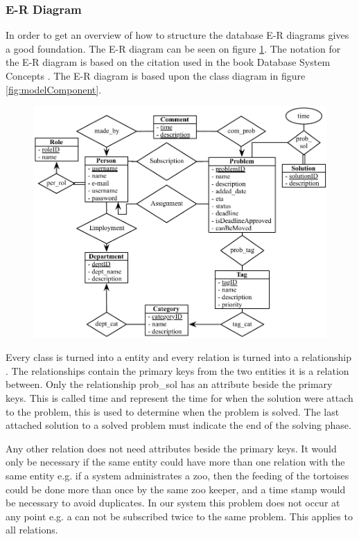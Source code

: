 \newcommand{\erdiagram}[1][]{E-R diagram}
\subsubsection{E-R Diagram}
In order to get an overview of how to structure the database \erdiagram[]s gives a good foundation.
The \erdiagram[] can be seen on figure \ref{fig:er_diagram}.
The notation for the \erdiagram[] is based on the citation used in the book Database System Concepts \cite[p. 305]{Sudershan2011}. 
The \erdiagram[] is based upon the class diagram in figure \ref{fig:modelComponent}. 

\begin{figure}[h]
	\centering
		\includegraphics[scale=0.8]{input/component_design/ER-diagram.pdf}
	\label{fig:er_diagram}
\end{figure}

Every class is turned into a entity and every relation is turned into a relationship \cite[p. 259 - 321]{Sudershan2011}.
The relationships contain the primary keys from the two entities it is a relation between.
Only the relationship prob\_sol has an attribute beside the primary keys.
This is called time and represent the time for when the solution were attach to the problem, this is used to determine when the problem is solved.
The last attached solution to a solved problem must indicate the end of the solving phase. 

Any other relation does not need attributes beside the primary keys.
It would only be necessary if the same entity could have more than one relation with the same entity e.g. if a system administrates a zoo, then the feeding of the tortoises could be done more than once by the same zoo keeper, and a time stamp would be necessary to avoid duplicates.
In our system this problem does not occur at any point e.g. a \client[] can not be subscribed twice to the same problem.
This applies to all relations. 

